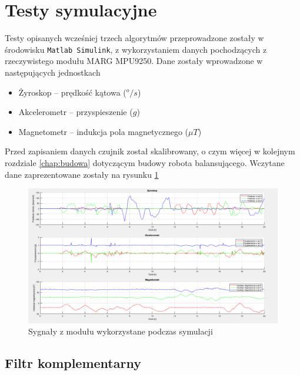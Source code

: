 \section{Testy symulacyjne}

Testy opisanych wcześniej trzech algorytmów przeprowadzone zostały w środowisku \texttt{Matlab Simulink}, z wykorzystaniem danych pochodzących z rzeczywistego modułu MARG MPU9250. Dane zostały wprowadzone w następujących jednostkach
\begin{itemize}
    \item Żyroskop -- prędkość kątowa ($^o/s$) 
    \item Akcelerometr -- przyspieszenie ($g$)
    \item Magnetometr -- indukcja pola magnetycznego ($\mu T$) 
\end{itemize}

Przed zapisaniem danych czujnik został skalibrowany, o czym więcej w kolejnym rozdziale \ref{chap:budowa} dotyczącym budowy robota balansującego. Wczytane dane zaprezentowane zostały na rysunku \ref{MARG sygnaly}
\begin{figure}[h!]
    \centering
    \includegraphics[width=1\textwidth]{Rysunki/Rozdzial04/MARG_sygnaly.png}
    \caption{Sygnały z modułu wykorzystane podczas symulacji}
    \label{MARG sygnaly}
\end{figure}

\newpage
\subsection{Filtr komplementarny}

